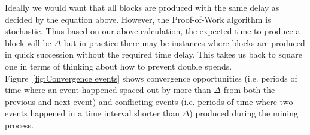 Ideally we would want that all blocks are produced with the same delay as decided by the equation above. However, the Proof-of-Work algorithm is stochastic. Thus based on our above calculation, the expected time to produce a block will be $\Delta$ but in practice there may be instances where blocks are produced in quick succession without the required time delay. This takes us back to square one in terms of thinking about how to prevent double spends. Figure~\ref{fig:Convergence events} shows convergence opportunities (i.e. periods of time where an event happened spaced out by more than $\Delta$ from both the previous and next event) and conflicting events (i.e. periods of time where two events happened in a time interval shorter than $\Delta$) produced during the mining process.

\begin{figure}[H]
\centering
{} %

\begin{tikzpicture}[x=0.75pt,y=0.75pt,yscale=-1,xscale=1]


\end{tikzpicture}
\end{figure}
